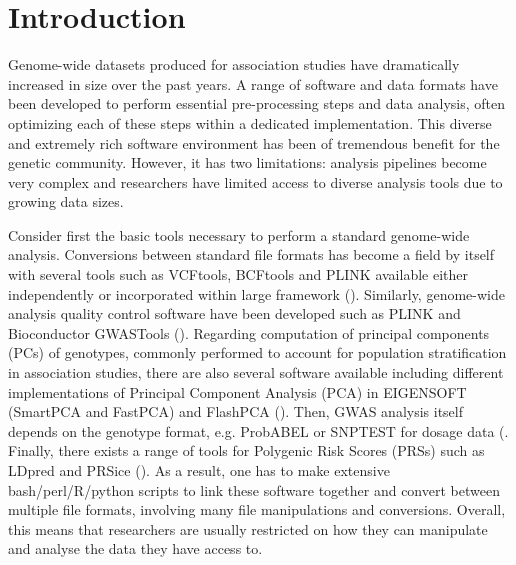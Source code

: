 \documentclass{bioinfo}
\begin{document}
\maketitle

\section{Introduction}

Genome-wide datasets produced for association studies have dramatically increased in size over the past years. A range of software and data formats have been developed to perform essential pre-processing steps and data analysis, often optimizing each of these steps within a dedicated implementation. This diverse and extremely rich software environment has been of tremendous benefit for the genetic community. However, it has two limitations: analysis pipelines become very complex and researchers have limited access to diverse analysis tools due to growing data sizes.

Consider first the basic tools necessary to perform a standard genome-wide analysis. Conversions between standard file formats has become a field by itself with several tools such as VCFtools, BCFtools and PLINK available either independently or incorporated within large framework (\cite{Danecek2011,Li2011,Purcell2007}). Similarly, genome-wide analysis quality control software have been developed such as PLINK and Bioconductor GWASTools (\cite{Gogarten2012}). Regarding computation of principal components (PCs) of genotypes, commonly performed to account for population stratification in association studies, there are also several software available including different implementations of Principal Component Analysis (PCA) in EIGENSOFT (SmartPCA and FastPCA) and FlashPCA (\cite{Price2006,Galinsky2016,Abraham2014a,Abraham2016a}). Then, GWAS analysis itself depends on the genotype format, e.g. ProbABEL or SNPTEST for dosage data (\cite{Aulchenko2010,Marchini2010}.  Finally, there exists a range of tools for Polygenic Risk Scores (PRSs) such as LDpred and PRSice (\cite{Vilhjalmsson2015,Euesden2015}). As a result, one has to make extensive bash/perl/R/python scripts to link these software together and convert between multiple file formats, involving many file manipulations and conversions. Overall, this means that researchers are usually restricted on how they can manipulate and analyse the data they have access to. 
\end{document}
